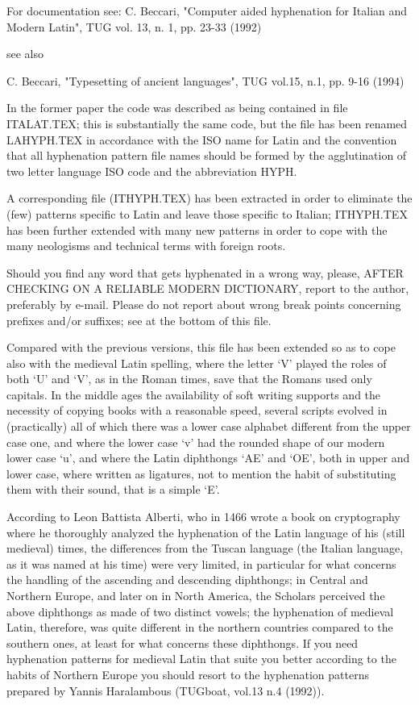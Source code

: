  For documentation see:
 C. Beccari, "Computer aided hyphenation for Italian and Modern
       Latin", TUG vol. 13, n. 1, pp. 23-33 (1992)

 see also

 C. Beccari, "Typesetting of ancient languages",
             TUG vol.15, n.1, pp. 9-16 (1994)

 In the former paper  the  code  was  described  as  being contained in file
 ITALAT.TEX; this is substantially the same code,  but  the  file  has  been
 renamed  LAHYPH.TEX  in  accordance  with  the  ISO  name for Latin and the
 convention that all hyphenation pattern file  names should be formed by the
 agglutination of two letter language ISO code and the abbreviation HYPH.

 A corresponding file (ITHYPH.TEX) has been extracted in order to  eliminate
 the  (few)  patterns specific to Latin and leave those specific to Italian;
 ITHYPH.TEX has been further  extended  with  many  new patterns in order to
 cope with the many neologisms and technical terms with foreign roots.

 Should you find any word that gets hyphenated in a wrong way, please, AFTER
 CHECKING  ON A RELIABLE MODERN DICTIONARY, report to the author, preferably
 by e-mail.  Please  do  not  report  about  wrong  break  points concerning
 prefixes and/or suffixes; see at the bottom of this file.

 Compared with the previous versions, this file has been extended so  as  to
 cope also with the medieval Latin spelling, where the letter `V' played the
 roles of both `U' and `V', as in the Roman times, save that the Romans used
 only capitals. In the middle ages the availability of soft writing supports
 and the necessity of copying books with a reasonable speed, several scripts
 evolved  in  (practically)  all  of  which  there was a lower case alphabet
 different from the upper case  one,  and  where  the lower case `v' had the
 rounded shape of our modern lower case `u', and where the Latin  diphthongs
 `AE'  and  `OE',  both in upper and lower case, where written as ligatures,
 not to mention the habit of  substituting  them with their sound, that is a
 simple `E'.

 According  to  Leon  Battista  Alberti,  who  in  1466  wrote  a  book   on
 cryptography  where  he  thoroughly  analyzed  the hyphenation of the Latin
 language of his (still  medieval)  times,  the  differences from the Tuscan
 language (the Italian language, as it was named  at  his  time)  were  very
 limited,  in particular for what concerns the handling of the ascending and
 descending diphthongs; in  Central  and  Northern  Europe,  and later on in
 North America, the Scholars perceived the above diphthongs as made  of  two
 distinct  vowels;  the  hyphenation of medieval Latin, therefore, was quite
 different in the northern countries compared to the southern ones, at least
 for what concerns these  diphthongs.  If  you need hyphenation patterns for
 medieval Latin that suite you better according to the  habits  of  Northern
 Europe  you  should  resort  to the hyphenation patterns prepared by Yannis
 Haralambous (TUGboat, vol.13 n.4 (1992)).

